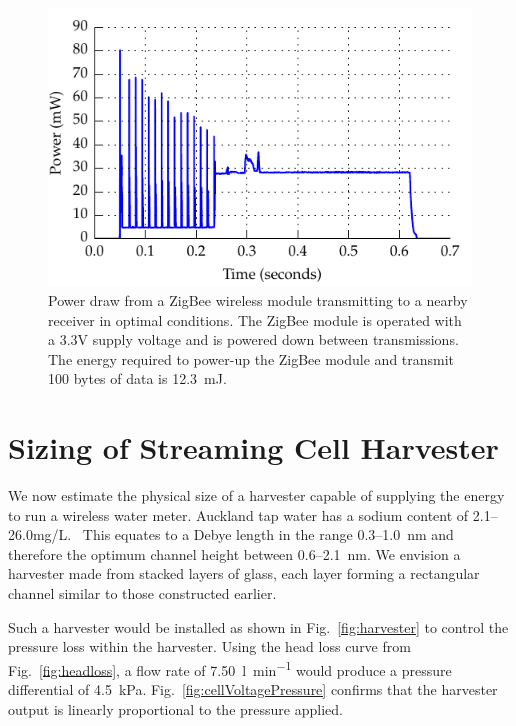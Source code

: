 \documentclass[10pt,final,journal]{IEEEtran}
\begin{document}
    \begin{figure}
        \begin{center}
        \includegraphics[width=\linewidth]{graph_XbeePower_reduced}
        \end{center}
        \caption{Power draw from a ZigBee wireless module transmitting to a nearby receiver in optimal conditions. The ZigBee module is operated with a 3.3V supply voltage and is powered down between transmissions. The energy required to power-up the ZigBee module and transmit 100 bytes of data is \SI{12.3}{\milli\joule}.}
        \label{fig:xbeePower}
    \end{figure}

    \section{Sizing of Streaming Cell Harvester}
    \label{sect:harvesterSize}
    We now estimate the physical size of a harvester capable of supplying the energy to run a wireless water meter.
    Auckland tap water has a sodium content of 2.1--26.0\thinspace mg/L.~\cite{WatercareNewZealand2012}
    This equates to a Debye length in the range 0.3--\SI{1.0}{\nano\metre} and therefore the optimum channel height between 0.6--\SI{2.1}{\nano\metre}.
    We envision a harvester made from stacked layers of glass, each layer forming a rectangular channel similar to those constructed earlier.
    
    Such a harvester would be installed as shown in Fig.~\ref{fig:harvester} to control the pressure loss within the harvester.
    Using the head loss curve from Fig.~\ref{fig:headloss}, a flow rate of \SI{7.50}{\litre\per\minute} would produce a pressure differential of \SI{4.5}{\kilo\pascal}.
    Fig.~\ref{fig:cellVoltagePressure} confirms that the harvester output is linearly proportional to the pressure applied.
\end{document}
